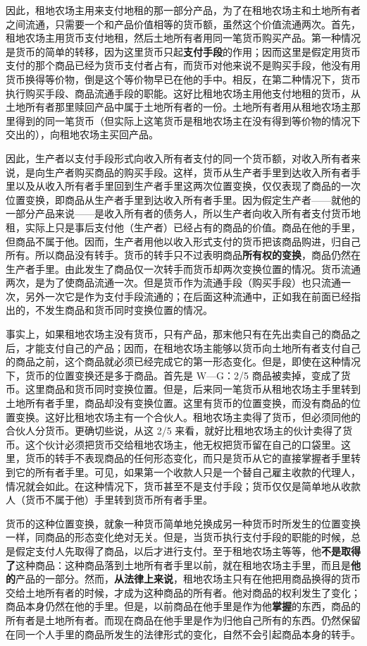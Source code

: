 因此，租地农场主用来支付地租的那一部分产品，为了在租地农场主和土地所有者之间流通，只需要一个和产品价值相等的货币额，虽然这个价值流通两次。首先，租地农场主用货币支付地租，然后土地所有者用同一笔货币购买产品。第一种情况是货币的简单的转移，因为这里货币只起\textbf{支付手段}的作用；因而这里是假定用货币支付的那个商品已经为货币支付者占有，而货币对他来说不是购买手段，他没有用货币换得等价物，倒是这个等价物早已在他的手中。相反，在第二种情况下，货币执行购买手段、商品流通手段的职能。这好比租地农场主用他支付地租的货币，从土地所有者那里赎回产品中属于土地所有者的一份。土地所有者用从租地农场主那里得到的同一笔货币（但实际上这笔货币是租地农场主在没有得到等价物的情况下交出的），向租地农场主买回产品。

因此，生产者以支付手段形式向收入所有者支付的同一个货币额，对收入所有者来说，是向生产者购买商品的购买手段。这样，货币从生产者手里到达收入所有者手里以及从收入所有者手里回到生产者手里这两次位置变换，仅仅表现了商品的一次位置变换，即商品从生产者手里到达收入所有者手里。因为假定生产者——就他的一部分产品来说——是收入所有者的债务人，所以生产者向收入所有者支付货币地租，实际上只是事后支付他（生产者）已经占有的商品的价值。商品在他的手里，但商品不属于他。因而，生产者用他以收入形式支付的货币把该商品购进，归自己所有。所以商品没有转手。货币的转手只不过表明商品\textbf{所有权的变换}，商品仍然在生产者手里。由此发生了商品仅一次转手而货币却两次变换位置的情况。货币流通两次，是为了使商品流通一次。但是货币作为流通手段（购买手段）也只流通一次，另外一次它是作为支付手段流通的；在后面这种流通中，正如我在前面已经指出的，不发生商品和货币同时变换位置的情况。

事实上，如果租地农场主没有货币，只有产品，那末他只有在先出卖自己的商品之后，才能支付自己的产品；因而，在租地农场主能够以货币向土地所有者支付自己的商品之前，这个商品就必须已经完成它的第一形态变化。但是，即使在这种情况下，货币的位置变换还是多于商品。首先是 W—G：2/5 商品被卖掉，变成了货币。这里商品和货币同时变换位置。但是，后来同一笔货币从租地农场主手里转到土地所有者手里，商品却没有变换位置。这里有货币的位置变换，而没有商品的位置变换。这好比租地农场主有一个合伙人。租地农场主卖得了货币，但必须同他的合伙人分货币。更确切些说，从这 2/5 来看，就好比租地农场主的伙计卖得了货币。这个伙计必须把货币交给租地农场主，他无权把货币留在自己的口袋里。这里，货币的转手不表现商品的任何形态变化，而只是货币从它的直接掌握者手里转到它的所有者手里。可见，如果第一个收款人只是一个替自己雇主收款的代理人，情况就会如此。在这种情况下，货币甚至不是支付手段；货币仅仅是简单地从收款人（货币不属于他）手里转到货币所有者手里。

货币的这种位置变换，就象一种货币简单地兑换成另一种货币时所发生的位置变换一样，同商品的形态变化绝对无关。但是，当货币执行支付手段的职能的时候，总是假定支付人先取得了商品，以后才进行支付。至于租地农场主等等，他\textbf{不是取得了}这种商品：这种商品落到土地所有者手里以前，就在租地农场主手里，而且是\textbf{他的}产品的一部分。然而，\textbf{从法律上来说}，租地农场主只有在他把用商品换得的货币交给土地所有者的时候，才成为这种商品的所有者。他对商品的权利发生了变化；商品本身仍然在他的手里。但是，以前商品在他手里是作为他\textbf{掌握}的东西，商品的所有者是土地所有者。而现在商品在他手里是作为归他自己所有的东西。仍然保留在同一个人手里的商品所发生的法律形式的变化，自然不会引起商品本身的转手。

